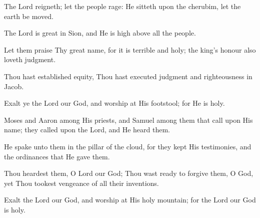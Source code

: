 The Lord reigneth; let the people rage: He sitteth upon the cherubim, let the earth be moved.

The Lord is great in Sion, and He is high above all the people.

Let them praise Thy great name, for it is terrible and holy; the king's honour also loveth judgment.

Thou hast established equity, Thou hast executed judgment and righteousness in Jacob.

Exalt ye the Lord our God, and worship at His footstool; for He is holy.

Moses and Aaron among His priests, and Samuel among them that call upon His name; they called upon the Lord, and He heard them.

He spake unto them in the pillar of the cloud, for they kept His testimonies, and the ordinances that He gave them.

Thou heardest them, O Lord our God; Thou wast ready to forgive them, O God, yet Thou tookest vengeance of all their inventions.

Exalt the Lord our God, and worship at His holy mountain; for the Lord our God is holy.
